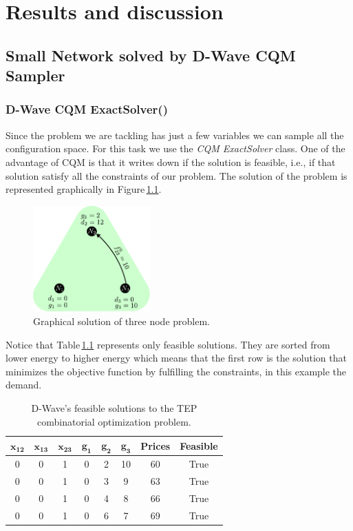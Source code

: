 
\chapter{Results and discussion} %
\label{Chapter5} %
\section{Small Network solved by D-Wave CQM Sampler}
\subsection{D-Wave CQM ExactSolver()}
Since the problem we are tackling has just a few variables we can sample all the configuration space. For this task we use the \textit{CQM ExactSolver} class. One of the advantage of CQM is that it writes down if the solution is feasible, i.e.,  if that solution satisfy all the constraints of our problem. The solution of the problem is represented graphically in Figure\,\ref{fig: Green_final}.
\begin{figure}[H]
  \begin{center}
\includegraphics[width=0.4\textwidth]{Figures/Green_Final.pdf}
  \end{center}
  \caption{Graphical solution of three node problem.}
  \label{fig: Green_final}
\end{figure}
Notice that Table\,\ref{tab:SmallNetworkResults} represents only feasible solutions. They are sorted from lower energy to higher energy which means that the first row is the solution that minimizes the objective function by fulfilling the constraints, in this example the demand.
 \begin{table}[H]
\centering
\begin{tabular}{ |c|c|c|c|c|c|c|c| }
  \hline			
  $\mathbf{x_{12}}$ & $\mathbf{x_{13}}$ & $\mathbf{x_{23}}$ & $\mathbf{g_{1}}$ & $\mathbf{g_{2}}$ & $\mathbf{g_{3}}$ & \textbf{Prices} & \textbf{Feasible} \\
  \hline
    0 & 0 & 1 & 0 & 2 & 10 & 60 & True \\
  \hline
    0 & 0 & 1 & 0 & 3 & 9 & 63 & True \\
  \hline
    0 & 0 & 1 & 0 & 4 & 8 & 66 & True \\
  \hline
    0 & 0 & 1 & 0 & 6 & 7 & 69 & True \\
  \hline
\end{tabular}
\caption{D-Wave's feasible solutions to the TEP combinatorial optimization problem.}
\label{tab:SmallNetworkResults}
\end{table}
